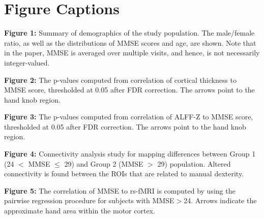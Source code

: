 \documentclass[review,3p,times,12pt,letterpaper]{elsarticle}
\begin{document}
 








\newpage
\section*{Figure Captions}

\textbf{Figure 1:} Summary of demographics of the study population. The male/female ratio, as well as the distributions of MMSE scores and age, are shown. Note that in the paper, MMSE is averaged over multiple visits, and hence, is not necessarily integer-valued.


\textbf{Figure 2:} The p-values computed from correlation of cortical thickness to MMSE score, thresholded at 0.05 after FDR correction. The arrows point to the hand knob region. 


\textbf{Figure 3:} The p-values computed from correlation of ALFF-Z to MMSE score, thresholded at 0.05 after FDR correction. The arrows point to the hand knob region.


\textbf{Figure 4:} Connectivity analysis study for mapping differences between Group 1 (24 $<$ MMSE $\leq$ 29) and Group 2 (MMSE $>$ 29) population. Altered connectivity is found between the ROIs that are related to manual dexterity.


\textbf{Figure 5:} The correlation of MMSE to rs-fMRI is computed by using the pairwise regression procedure for subjects with MMSE$>$24. Arrows indicate the approximate hand area within the motor cortex.
\end{document}

